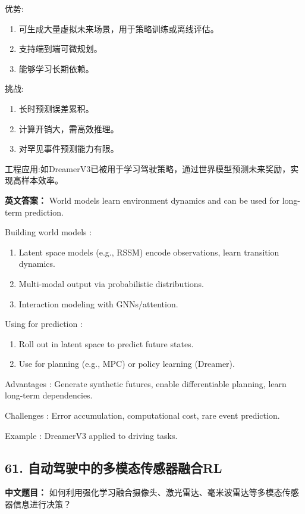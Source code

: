 \documentclass[10pt,a4paper]{ctexart}
\begin{document}
 优势:
\begin{enumerate}
    \item 可生成大量虚拟未来场景，用于策略训练或离线评估。
    \item 支持端到端可微规划。
    \item 能够学习长期依赖。
\end{enumerate}

 挑战:
\begin{enumerate}
    \item 长时预测误差累积。
    \item 计算开销大，需高效推理。
    \item 对罕见事件预测能力有限。
\end{enumerate}

 工程应用:如DreamerV3已被用于学习驾驶策略，通过世界模型预测未来奖励，实现高样本效率。

\textbf{英文答案：}  
World models learn environment dynamics and can be used for long-term prediction.

 Building world models :
\begin{enumerate}
    \item Latent space models (e.g., RSSM) encode observations, learn transition dynamics.
    \item Multi-modal output via probabilistic distributions.
    \item Interaction modeling with GNNs/attention.
\end{enumerate}

 Using for prediction :
\begin{enumerate}
    \item Roll out in latent space to predict future states.
    \item Use for planning (e.g., MPC) or policy learning (Dreamer).
\end{enumerate}

 Advantages : Generate synthetic futures, enable differentiable planning, learn long-term dependencies.

 Challenges : Error accumulation, computational cost, rare event prediction.

 Example : DreamerV3 applied to driving tasks.

\subsection*{61. 自动驾驶中的多模态传感器融合RL}
\textbf{中文题目：} 如何利用强化学习融合摄像头、激光雷达、毫米波雷达等多模态传感器信息进行决策？
\end{document}
